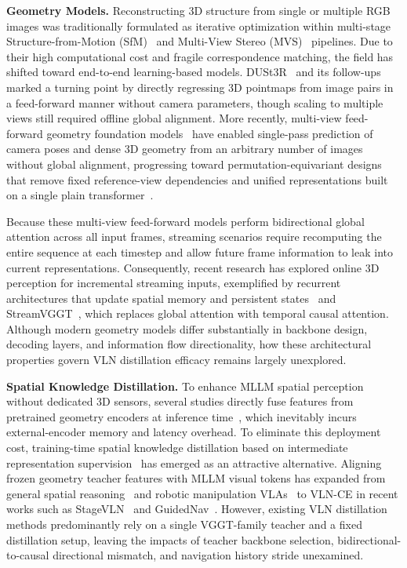 \textbf{Geometry Models.} Reconstructing 3D structure from single or multiple RGB images was traditionally formulated as iterative optimization within multi-stage Structure-from-Motion (SfM)~\cite{schnberger2016structure} and Multi-View Stereo (MVS)~\cite{furukawa2015multi} pipelines. Due to their high computational cost and fragile correspondence matching, the field has shifted toward end-to-end learning-based models. DUSt3R~\cite{wang2024dust3r} and its follow-ups~\cite{leroy2024grounding,zhang2025monst3r} marked a turning point by directly regressing 3D pointmaps from image pairs in a feed-forward manner without camera parameters, though scaling to multiple views still required offline global alignment. More recently, multi-view feed-forward geometry foundation models~\cite{yang2025fast3r,wang2025vggt,wang2026permutation,lin2025depth} have enabled single-pass prediction of camera poses and dense 3D geometry from an arbitrary number of images without global alignment, progressing toward permutation-equivariant designs that remove fixed reference-view dependencies and unified representations built on a single plain transformer~\cite{wang2026permutation,lin2025depth}.

Because these multi-view feed-forward models perform bidirectional global attention across all input frames, streaming scenarios require recomputing the entire sequence at each timestep and allow future frame information to leak into current representations. Consequently, recent research has explored online 3D perception for incremental streaming inputs, exemplified by recurrent architectures that update spatial memory and persistent states~\cite{wang20243d,wang2025continuous} and StreamVGGT~\cite{zhuo2026streamvggt}, which replaces global attention with temporal causal attention. Although modern geometry models differ substantially in backbone design, decoding layers, and information flow directionality, how these architectural properties govern VLN distillation efficacy remains largely unexplored.

\textbf{Spatial Knowledge Distillation.} To enhance MLLM spatial perception without dedicated 3D sensors, several studies directly fuse features from pretrained geometry encoders at inference time~\cite{zeng2026janusvln,wu2025spatial,zheng2025learning}, which inevitably incurs external-encoder memory and latency overhead. To eliminate this deployment cost, training-time spatial knowledge distillation based on intermediate representation supervision~\cite{romero2015fitnets} has emerged as an attractive alternative. Aligning frozen geometry teacher features with MLLM visual tokens has expanded from general spatial reasoning~\cite{huang20253drs,huang2026what} and robotic manipulation VLAs~\cite{li2026spatial} to VLN-CE in recent works such as StageVLN~\cite{dao2026stagevln} and GuidedNav~\cite{guo2026guidednav}. However, existing VLN distillation methods predominantly rely on a single VGGT-family teacher and a fixed distillation setup, leaving the impacts of teacher backbone selection, bidirectional-to-causal directional mismatch, and navigation history stride unexamined.
